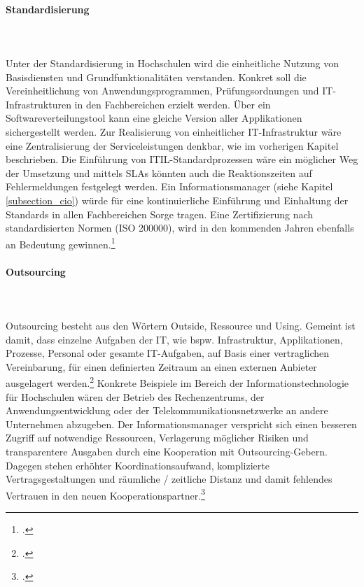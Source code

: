 \paragraph{Standardisierung}\mbox{}\\\\
Unter der Standardisierung in Hochschulen wird die einheitliche Nutzung von Basisdiensten und Grundfunktionalitäten verstanden. Konkret soll die Vereinheitlichung von Anwendungsprogrammen, Prüfungsordnungen und IT-Infrastrukturen in den Fachbereichen erzielt werden. Über ein Softwareverteilungstool kann eine gleiche Version aller Applikationen sichergestellt werden. Zur Realisierung von einheitlicher IT-Infrastruktur wäre eine Zentralisierung der Serviceleistungen denkbar, wie im vorherigen Kapitel beschrieben. Die Einführung von ITIL-Standardprozessen wäre ein möglicher Weg der Umsetzung und mittels SLAs könnten auch die Reaktionszeiten auf Fehlermeldungen festgelegt werden. Ein Informationsmanager (siehe Kapitel \ref{subsection_cio}) würde für eine kontinuierliche Einführung und Einhaltung der Standards in allen Fachbereichen Sorge tragen. Eine Zertifizierung nach standardisierten Normen (ISO 200000), wird in den kommenden Jahren ebenfalls an Bedeutung gewinnen.\footcite[Vgl.][168]{breiter_implementierung_2011}


\paragraph{Outsourcing}\mbox{}\\\\
Outsourcing besteht aus den Wörtern \glqq Outside\grqq{}, \glqq Ressource\grqq{} und \glqq Using\grqq{}. Gemeint ist damit, dass einzelne Aufgaben der IT, wie bspw. Infrastruktur, Applikationen, Prozesse, Personal oder gesamte 
IT-Aufgaben, auf Basis einer vertraglichen Vereinbarung, für einen definierten Zeitraum an einen 
externen Anbieter ausgelagert werden.\footcite[Vgl.][164]{krcmar_einfuhrung_2015} Konkrete 
Beispiele im Bereich der Informationstechnologie für Hochschulen wären der Betrieb des 
Rechenzentrums, der Anwendungsentwicklung oder der Telekommunikationsnetzwerke an andere 
Unternehmen abzugeben. Der Informationsmanager verspricht sich einen besseren Zugriff auf 
notwendige Ressourcen, Verlagerung möglicher Risiken und transparentere Ausgaben durch eine 
Kooperation mit Outsourcing-Gebern. Dagegen stehen erhöhter Koordinationsaufwand, komplizierte 
Vertragsgestaltungen und räumliche / zeitliche Distanz und damit fehlendes Vertrauen in den neuen 
Kooperationspartner.\footcite[Vgl.][195 ff.]{barthelemy_2001}

